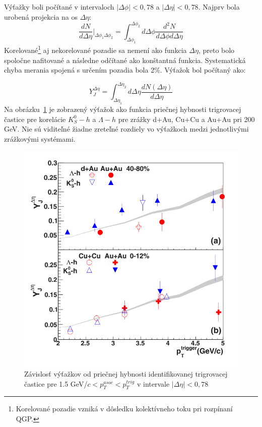 \documentclass[thesismargins, thesislinespacing]{rnthesis}
\begin{document}
Výťažky boli počítané v intervaloch $|\Delta\phi|<0,78$ a $|\Delta\eta|<0,78$. Najprv bola urobená projekcia na os $\Delta\eta$:
\begin{equation}
\frac{dN}{d\Delta\eta}|_{\Delta\phi_1 \Delta\phi_2}= \int_{\Delta\phi_1}^{\Delta\phi_2}d\Delta\phi \frac{d^2N}{d\Delta \phi d\Delta \eta}
\end{equation}
Korelované\footnote{Korelované pozadie vzniká v dôsledku kolektívneho toku pri rozpínaní QGP.} aj nekorelované pozadie sa nemení ako funkcia $\Delta \eta$, preto bolo spoločne nafitované a následne odčítané ako konštantná funkcia. Systematická chyba merania spojená s určením pozadia bola 2\%. Výťažok bol počítaný ako:

\begin{equation}
Y^{\Delta\eta}_J=\int_{\Delta\eta_1}^{\Delta\eta_2}d\Delta\eta \frac{dN(\Delta\eta)}{d\Delta\eta}
\end{equation}
Na obrázku~\ref{clanokstar} je zobrazený výťažok ako funkcia priečnej hybnosti trigrovacej častice pre korelácie $K_S^0 - h$ a $\Lambda-h$ pre zrážky d+Au, Cu+Cu a Au+Au pri 200 GeV. Nie sú viditeľné žiadne zreteľné rozdiely vo výťažkoch medzi jednotlivými zrážkovými systémami. 

\begin{figure}[hbtp!]
	\centering
	\includegraphics[scale=0.5]{./Obrazky_praca/clanokstar.png}
	\caption{Závislosť výťažkov od priečnej hybnosti identifikovanej trigrovacej častice pre 1.5 GeV/$c <p_T^{asoc}<p_T^{trig}$ v intervale $|\Delta\eta|<0,78$ ~\cite{clanokstar}}
	\label{clanokstar}
\end{figure}
\end{document}
